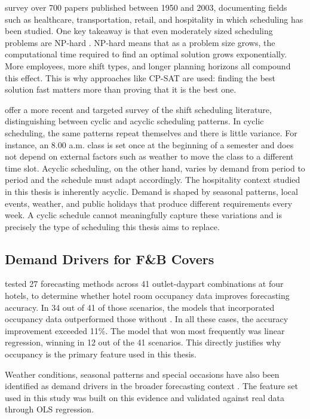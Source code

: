 \documentclass[12pt,a4paper,oneside]{article}
\begin{document}
\citet{ernst2004} survey over 700 papers published between 1950 and 2003, documenting  fields such as healthcare, transportation, retail, and hospitality in which scheduling has been studied. One key takeaway is that even moderately sized scheduling problems are NP-hard \citep{ernst2004}. NP-hard means that as a problem size grows, the computational time required to find an optimal solution grows exponentially. More employees, more shift types, and longer planning horizons all compound this effect. This is why approaches like CP-SAT are used: finding the best solution fast matters more than proving that it is the best one.


\citet{bergh2013} offer a more recent and targeted survey of the shift scheduling literature, distinguishing between cyclic and acyclic scheduling patterns. In cyclic scheduling, the same patterns repeat themselves and there is little variance. For instance, an 8.00 a.m. class is set once at the beginning of a semester and does not depend on external factors such as weather to move the class to a different time slot. Acyclic scheduling, on the other hand, varies by demand from period to period and the schedule must adapt accordingly. The hospitality context studied in this thesis is inherently acyclic. Demand is shaped by seasonal patterns, local events, weather, and public holidays that produce different requirements every week. A cyclic schedule cannot meaningfully capture these variations and is precisely the type of scheduling this thesis aims to replace.


\subsection{Demand Drivers for F\&B Covers}

\citet{thompson2008} tested 27 forecasting methods across 41 outlet-daypart combinations at four hotels, to determine whether hotel room occupancy data improves forecasting accuracy. In 34 out of 41 of those scenarios, the models that incorporated occupancy data outperformed those without \citep{thompson2008}. In all these cases, the accuracy improvement exceeded 11\%. The model that won most frequently was linear regression, winning in 12 out of the 41 scenarios. This directly justifies why occupancy is the primary feature used in this thesis.

Weather conditions, seasonal patterns and special occasions have also been identified as demand drivers in the broader forecasting context \citep{pmc2025, heliyon2023}. The feature set used in this study was built on this evidence and validated against real data through OLS regression.
\end{document}
